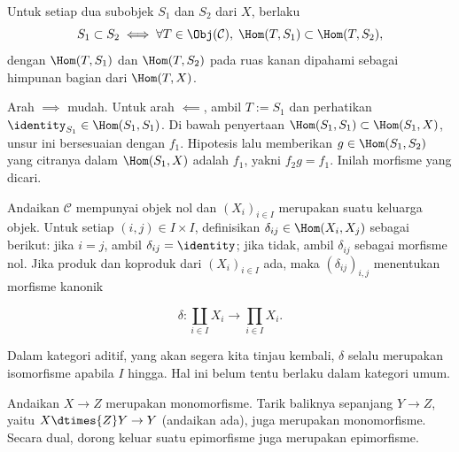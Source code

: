 \begin{lema}\label{prop:subobject-order}
	Untuk setiap dua subobjek $S_1$ dan $S_2$ dari $X$, berlaku
	\begin{equation*}
		S_1 \subset S_2 \iff \forall T \in \Obj(\mathcal{C}), \; \Hom(T, S_1) \subset \Hom(T, S_2),
	\end{equation*}
	dengan $\Hom(T, S_1)$ dan $\Hom(T, S_2)$ pada ruas kanan dipahami sebagai
	himpunan bagian dari $\Hom(T, X)$.
\end{lema}

\begin{bukti}
	Arah $\implies$ mudah. Untuk arah $\impliedby$, ambil $T := S_1$ dan
	perhatikan $\identity_{S_1} \in \Hom(S_1, S_1)$. Di bawah penyertaan
	$\Hom(S_1,S_1) \subset \Hom(S_1,X)$, unsur ini bersesuaian dengan $f_1$.
	Hipotesis lalu memberikan $g \in \Hom(S_1,S_2)$ yang citranya dalam
	$\Hom(S_1,X)$ adalah $f_1$, yakni $f_2g=f_1$. Inilah morfisme yang dicari.
\end{bukti}

Andaikan $\mathcal{C}$ mempunyai objek nol dan
$(X_i)_{i \in I}$ merupakan suatu keluarga objek. Untuk setiap
$(i,j) \in I \times I$, definisikan $\delta_{ij} \in \Hom(X_i, X_j)$ sebagai
berikut: jika $i=j$, ambil $\delta_{ij} = \identity$; jika tidak, ambil
$\delta_{ij}$ sebagai morfisme nol. Jika produk dan koproduk dari
$(X_i)_{i \in I}$ ada, maka $(\delta_{ij})_{i,j}$ menentukan morfisme kanonik

\begin{equation}\label{eqn:coprod-prod-delta}
	\delta: \coprod_{i \in I} X_i \to \prod_{i \in I} X_i.
\end{equation}

Dalam kategori aditif, yang akan segera kita tinjau kembali, $\delta$ selalu
merupakan isomorfisme apabila $I$ hingga. Hal ini belum tentu berlaku dalam
kategori umum.

\begin{lema}\label{prop:mono-pullback}
	Andaikan $X \to Z$ merupakan monomorfisme. Tarik baliknya sepanjang
	$Y \to Z$, yaitu $X \dtimes{Z} Y \to Y$ (andaikan ada), juga merupakan
	monomorfisme. Secara dual, dorong keluar suatu epimorfisme juga merupakan
	epimorfisme.
\end{lema}

